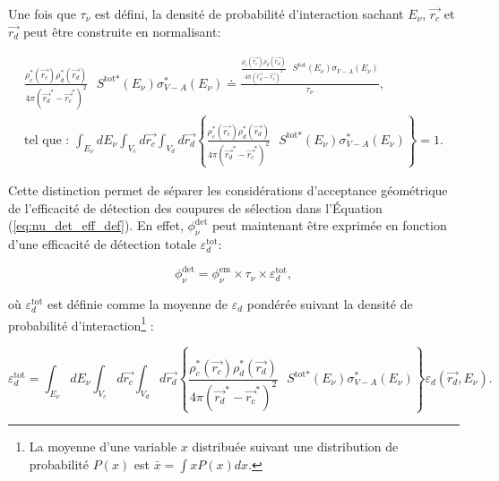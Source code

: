 \bigbreak

Une fois que $\tau_\nu$ est défini, la densité de probabilité d'interaction sachant $E_\nu$, $\overrightarrow{r_c}$ et $\overrightarrow{r_d}$ peut être construite en normalisant:

\begin{equation}
\begin{gathered}
    \frac{\rho_c^*(\overrightarrow{r_c})\rho_d^*(\overrightarrow{r_d})}{4\pi (\overrightarrow{r_d}^* - \overrightarrow{r_c}^*)^2}\textrm{ } S^{\textrm{tot}*}(E_\nu) \sigma_{V-A}^*(E_\nu) \doteq \frac{\frac{\rho_c(\overrightarrow{r_c})\rho_d(\overrightarrow{r_d})}{4\pi (\overrightarrow{r_d} - \overrightarrow{r_c})^2} \textrm{ } S^\textrm{tot}(E_\nu) \sigma_{V-A}(E_\nu)}{\tau_\nu},\\
    \textrm{tel que : } \int_{E_\nu} dE_\nu \int_{V_c} d\overrightarrow{r_c} \int_{V_d} d\overrightarrow{r_d} \left\{ \frac{\rho_c^*(\overrightarrow{r_c})\rho_d^*(\overrightarrow{r_d})}{4\pi (\overrightarrow{r_d}^* - \overrightarrow{r_c}^*)^2}\textrm{ } S^{\textrm{tot}*}(E_\nu) \sigma_{V-A}^*(E_\nu) \right\} = 1.
\end{gathered}
\end{equation}

\bigbreak

Cette distinction permet de séparer les considérations d'acceptance géométrique de l'efficacité de détection des coupures de sélection dans l'Équation (\ref{eq:nu_det_eff_def}). En effet, $\phi_\nu^{\textrm{det}}$ peut maintenant être exprimée en fonction d'une efficacité de détection totale $\varepsilon_d^{\textrm{tot}}$:

\begin{equation}
\label{eq:phi_nu_simple}
    \phi_\nu^{\textrm{det}} = \phi_\nu^{\textrm{em}} \times \tau_\nu \times \varepsilon_d^{\textrm{tot}},
\end{equation}

\bigbreak

où $\varepsilon_d^{\textrm{tot}}$ est définie comme la moyenne de $\varepsilon_d$ pondérée suivant la densité de probabilité d'interaction\footnote{La moyenne d'une variable $x$ distribuée suivant une distribution de probabilité $P(x)$ est $\bar{x} = \int xP(x) dx$.} :

\begin{equation}
\label{eq:def_detection_eff}
    \varepsilon_d^{\textrm{tot}} = \int_{E_\nu} dE_\nu \int_{V_c} d\overrightarrow{r_c} \int_{V_d} d\overrightarrow{r_d} \left\{ \frac{\rho_c^*(\overrightarrow{r_c})\rho_d^*(\overrightarrow{r_d})}{4\pi (\overrightarrow{r_d}^* - \overrightarrow{r_c}^*)^2}\textrm{ } S^{\textrm{tot}*}(E_\nu) \sigma_{V-A}^*(E_\nu) \right\} \varepsilon_d(\overrightarrow{r_d}, E_\nu).
\end{equation}

